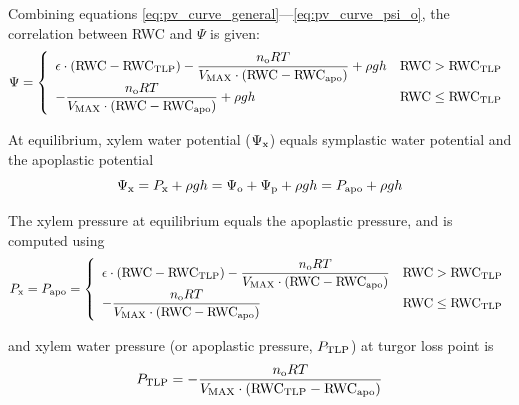 \documentclass[twoside,10pt]{report}
\begin{document}
\par Combining equations \ref{eq:pv_curve_general}---\ref{eq:pv_curve_psi_o}, the correlation between RWC and $\Psi$ is given:
\begin{equation}
    \Psi = \left\{
            \begin{array}{lr} 
                \epsilon \cdot \left( \text{RWC} - \text{RWC}_\text{TLP} \right) - \dfrac{n_\text{o} RT}{V_\text{MAX} \cdot \left( \text{RWC} - \text{RWC}_\text{apo} \right)} + \rho gh & \text{RWC} > \text{RWC}_\text{TLP} \\
                -\dfrac{n_\text{o} RT}{V_\text{MAX} \cdot \left( \text{RWC} - \text{RWC}_\text{apo} \right)} + \rho gh                                               & \text{RWC} \leq \text{RWC}_\text{TLP}
            \end{array}
        \right.
    \label{eq:pv_curve_Psi}
\end{equation}
\par \noindent At equilibrium, xylem water potential ($\Psi_\text{x}$) equals symplastic water potential and the apoplastic potential
\begin{equation}
    \Psi_\text{x} = P_\text{x} + \rho gh = \Psi_\text{o} + \Psi_\text{p} + \rho gh = P_\text{apo} + \rho gh
\end{equation}
\par \noindent The xylem pressure at equilibrium equals the apoplastic pressure, and is computed using
\begin{equation}
    P_\text{x} = P_\text{apo} = \left\{
            \begin{array}{lr} 
                \epsilon \cdot \left( \text{RWC} - \text{RWC}_\text{TLP} \right) - \dfrac{n_\text{o} RT}{V_\text{MAX} \cdot \left( \text{RWC} - \text{RWC}_\text{apo} \right)} & \text{RWC} > \text{RWC}_\text{TLP} \\
                -\dfrac{n_\text{o} RT}{V_\text{MAX} \cdot \left( \text{RWC} - \text{RWC}_\text{apo} \right)}                                               & \text{RWC} \leq \text{RWC}_\text{TLP}
            \end{array}
        \right.
    \label{eq:pv_curve_Psi_x}
\end{equation}
\par \noindent and xylem water pressure (or apoplastic pressure, $P_\text{TLP}$) at turgor loss point is
\begin{equation}
    P_\text{TLP} = -\dfrac{n_\text{o} RT}{V_\text{MAX} \cdot \left( \text{RWC}_\text{TLP} - \text{RWC}_\text{apo} \right)}
    \label{eq:pv_curve_TLP}
\end{equation}
\end{document}

